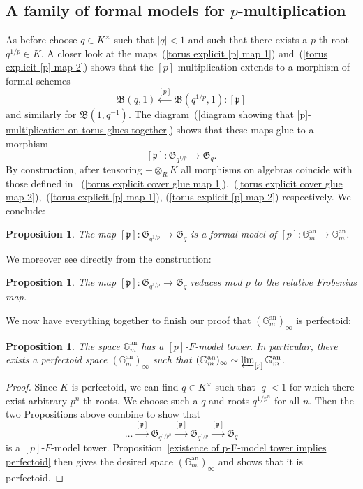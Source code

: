 \documentclass[11pt,oneside]{amsart}
\newtheorem{proposition}[theorem]{Proposition}
\theoremstyle{definition}
\theoremstyle{remark}
\begin{document}
	\subsection{A family of formal models for $p$-multiplication}
	As before choose $q\in K^\times$ such that $|q|<1$ and such that there exists a $p$-th root $q^{1/p} \in K$. A closer look at the maps~(\ref{torus explicit [p] map 1}) and~(\ref{torus explicit [p] map 2}) shows that the $[p]$-multiplication extends to a morphism of formal schemes
	\[\mathfrak B(q,1)\xleftarrow{[p]} \mathfrak B(q^{1/p},1):[\mathfrak p]\]
	and similarly for $\mathfrak B(1,q^{-1})$. The diagram~(\ref{diagram showing that [p]-multiplication on torus glues together}) shows that these maps glue to a morphism
	\[[\mathfrak p]: \mathfrak G_{q^{1/p}}\rightarrow  \mathfrak G_q.\]
	By construction, after tensoring $-\otimes_R K$ all morphisms on algebras coincide with those defined in ~(\ref{torus explicit cover glue map 1}),~(\ref{torus explicit cover glue map 2}),~(\ref{torus explicit [p] map 1}), (\ref{torus explicit [p] map 2}) respectively. We conclude:
	\begin{proposition}
		The map $[\mathfrak p]: \mathfrak G_{q^{1/p}}\rightarrow  \mathfrak G_q$ is a formal model of $[p]:\mathbb G_m^{\operatorname{an}}\rightarrow \mathbb G_m^{\operatorname{an}}$.
	\end{proposition}
	We moreover see directly from the construction:
	\begin{proposition}
		The map $[\mathfrak p]: \mathfrak G_{q^{1/p}}\rightarrow  \mathfrak G_q$ reduces mod $p$ to the relative Frobenius map.
	\end{proposition}
	We now have everything together to finish our proof that $(\mathbb G_m^{\operatorname{an}})_\infty$ is perfectoid:
	\begin{proposition}
		The space $\mathbb G_m^{\operatorname{an}}$ has a $[p]$-$F$-model tower. In particular, there exists a perfectoid space $(\mathbb G_m^{\operatorname{an}})_\infty$ such that $(\mathbb G_m^{\operatorname{an}})_\infty \sim \varprojlim_{[p]} \mathbb G_m^{\operatorname{an}}$.
	\end{proposition}
	\begin{proof}
		Since $K$ is perfectoid, we can find $q\in K^\times$ such that $|q|<1$ for which there exist arbitrary $p^n$-th roots. We choose such a $q$ and roots $q^{1/p^n}$ for all $n$. Then the two Propositions above combine to show that 
		\[\dots \xrightarrow{[\mathfrak p]} \mathfrak G_{q^{1/p^2}}\xrightarrow{[\mathfrak p]} \mathfrak G_{q^{1/p}}\xrightarrow{[\mathfrak p]} \mathfrak G_q\]
		is a $[p]$-$F$-model tower. Proposition~\ref{existence of p-F-model tower implies perfectoid} then gives the desired space $(\mathbb G_m^{\operatorname{an}})_\infty$ and shows that it is perfectoid.
	\end{proof}
	
\end{document}
